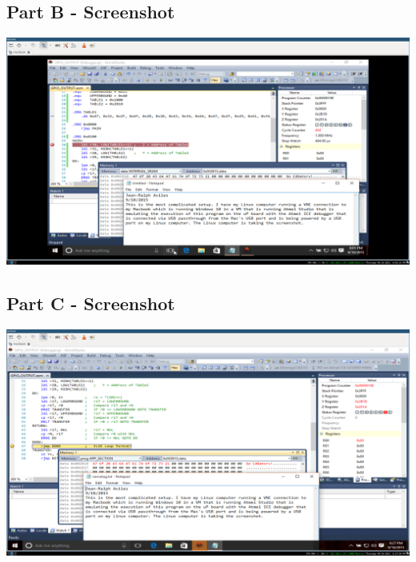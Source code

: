 \documentclass[letterpaper, 12pt]{article}
\begin{document}
\subsection*{Part B - Screenshot}
\begin{center}
\includegraphics[width=1.0\textwidth,keepaspectratio=true]{debug_simulated}
\end{center}
\subsection*{Part C - Screenshot}
\begin{center}
\includegraphics[width=1.0\textwidth,keepaspectratio=true]{debug_emulated}
\end{center}
\end{document}
